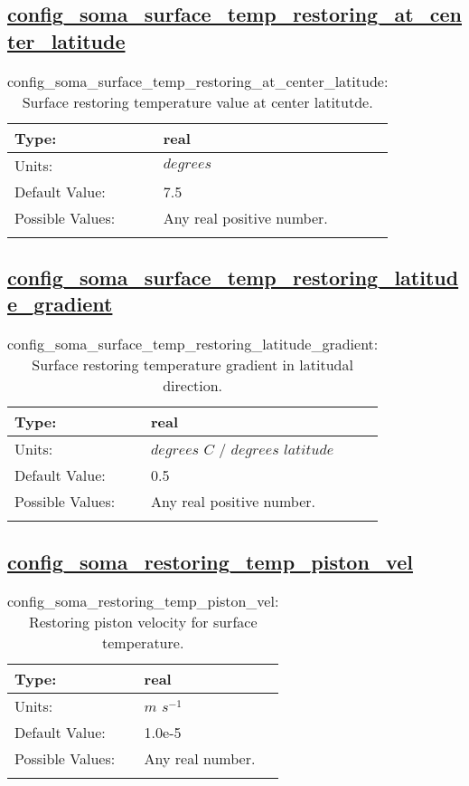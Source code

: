 \subsection[config\_soma\_surface\_temp\_restoring\_at\_center\_latitude]{\hyperref[sec:nm_tab_soma]{config\_soma\_surface\_temp\_restoring\_at\_center\_latitude}}
\label{subsec:nm_sec_config_soma_surface_temp_restoring_at_center_latitude}
\begin{center}
\begin{longtable}{| p{2.0in} || p{4.0in} |}
    \hline
    Type: & real \\
    \hline
    Units: & $degrees$ \\
    \hline
    Default Value: & 7.5 \\
    \hline
    Possible Values: & Any real positive number. \\
    \hline
    \caption{config\_soma\_surface\_temp\_restoring\_at\_center\_latitude: Surface restoring temperature value at center latitutde.}
\end{longtable}
\end{center}
\subsection[config\_soma\_surface\_temp\_restoring\_latitude\_gradient]{\hyperref[sec:nm_tab_soma]{config\_soma\_surface\_temp\_restoring\_latitude\_gradient}}
\label{subsec:nm_sec_config_soma_surface_temp_restoring_latitude_gradient}
\begin{center}
\begin{longtable}{| p{2.0in} || p{4.0in} |}
    \hline
    Type: & real \\
    \hline
    Units: & $degrees$ $C$ $/$ $degrees$ $latitude$ \\
    \hline
    Default Value: & 0.5 \\
    \hline
    Possible Values: & Any real positive number. \\
    \hline
    \caption{config\_soma\_surface\_temp\_restoring\_latitude\_gradient: Surface restoring temperature gradient in latitudal direction.}
\end{longtable}
\end{center}
\subsection[config\_soma\_restoring\_temp\_piston\_vel]{\hyperref[sec:nm_tab_soma]{config\_soma\_restoring\_temp\_piston\_vel}}
\label{subsec:nm_sec_config_soma_restoring_temp_piston_vel}
\begin{center}
\begin{longtable}{| p{2.0in} || p{4.0in} |}
    \hline
    Type: & real \\
    \hline
    Units: & $m$ $s^{-1}$ \\
    \hline
    Default Value: & 1.0e-5 \\
    \hline
    Possible Values: & Any real number. \\
    \hline
    \caption{config\_soma\_restoring\_temp\_piston\_vel: Restoring piston velocity for surface temperature.}
\end{longtable}
\end{center}
